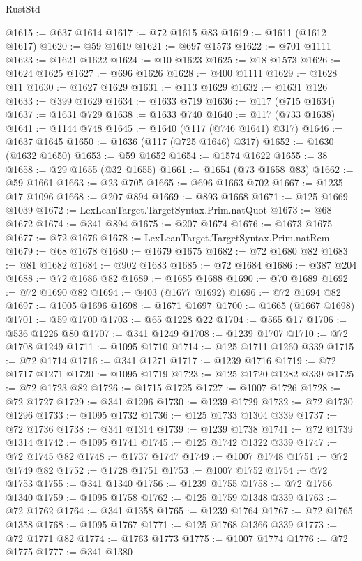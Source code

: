 \begin{lexlean}{RustStd}
\begin{coremodule}
{\begin{coremodule}
{{{{{{{{{{{{{{{{{{{{{{{{{{{{{{{{{{{{{{{{{{{{{{{{{{{{{{{@1615 := @637 @1614
@1617 := @72 @1615 @83
@1619 := @1611 (@1612 @1617)
@1620 := @59 @1619
@1621 := @697 @1573
@1622 := @701 @1111
@1623 := @1621 @1622
@1624 := @10 @1623
@1625 := @18 @1573
@1626 := @1624 @1625
@1627 := @696 @1626
@1628 := @400 @1111
@1629 := @1628 @11
@1630 := @1627 @1629
@1631 := @113 @1629
@1632 := @1631 @126
@1633 := @399 @1629
@1634 := @1633 @719
@1636 := @117 (@715 @1634)
@1637 := @1631 @729
@1638 := @1633 @740
@1640 := @117 (@733 @1638)
@1641 := @1144 @748
@1645 := @1640 (@117 (@746 @1641) @317)
@1646 := @1637 @1645
@1650 := @1636 (@117 (@725 @1646) @317)
@1652 := @1630 (@1632 @1650)
@1653 := @59 @1652
@1654 := @1574 @1622
@1655 := 38
@1658 := @29 @1655 (@32 @1655)
@1661 := @1654 (@73 @1658 @83)
@1662 := @59 @1661
@1663 := @23 @705
@1665 := @696 @1663 @702
@1667 := @1235 @17 @1096
@1668 := @207 @894
@1669 := @893 @1668
@1671 := @125 @1669 @1039
@1672 := LexLeanTarget.TargetSyntax.Prim.natQuot
@1673 := @68 @1672
@1674 := @341 @894
@1675 := @207 @1674
@1676 := @1673 @1675
@1677 := @72 @1676
@1678 := LexLeanTarget.TargetSyntax.Prim.natRem
@1679 := @68 @1678
@1680 := @1679 @1675
@1682 := @72 @1680 @82
@1683 := @81 @1682
@1684 := @902 @1683
@1685 := @72 @1684
@1686 := @387 @204
@1688 := @72 @1686 @82
@1689 := @1685 @1688
@1690 := @70 @1689
@1692 := @72 @1690 @82
@1694 := @403 (@1677 @1692)
@1696 := @72 @1694 @82
@1697 := @1005 @1696
@1698 := @1671 @1697
@1700 := @1665 (@1667 @1698)
@1701 := @59 @1700
@1703 := @65 @1228 @22
@1704 := @565 @17
@1706 := @536 @1226 @80
@1707 := @341 @1249
@1708 := @1239 @1707
@1710 := @72 @1708 @1249
@1711 := @1095 @1710
@1714 := @125 @1711 @1260 @339
@1715 := @72 @1714
@1716 := @341 @1271
@1717 := @1239 @1716
@1719 := @72 @1717 @1271
@1720 := @1095 @1719
@1723 := @125 @1720 @1282 @339
@1725 := @72 @1723 @82
@1726 := @1715 @1725
@1727 := @1007 @1726
@1728 := @72 @1727
@1729 := @341 @1296
@1730 := @1239 @1729
@1732 := @72 @1730 @1296
@1733 := @1095 @1732
@1736 := @125 @1733 @1304 @339
@1737 := @72 @1736
@1738 := @341 @1314
@1739 := @1239 @1738
@1741 := @72 @1739 @1314
@1742 := @1095 @1741
@1745 := @125 @1742 @1322 @339
@1747 := @72 @1745 @82
@1748 := @1737 @1747
@1749 := @1007 @1748
@1751 := @72 @1749 @82
@1752 := @1728 @1751
@1753 := @1007 @1752
@1754 := @72 @1753
@1755 := @341 @1340
@1756 := @1239 @1755
@1758 := @72 @1756 @1340
@1759 := @1095 @1758
@1762 := @125 @1759 @1348 @339
@1763 := @72 @1762
@1764 := @341 @1358
@1765 := @1239 @1764
@1767 := @72 @1765 @1358
@1768 := @1095 @1767
@1771 := @125 @1768 @1366 @339
@1773 := @72 @1771 @82
@1774 := @1763 @1773
@1775 := @1007 @1774
@1776 := @72 @1775
@1777 := @341 @1380
}}}}}}}}}}}}}}}}}}}}}}}}}}}}}}}}}}}}}}}}}}}}}}}}}}}}}}}
\end{coremodule}}
\end{coremodule}
\end{lexlean}
